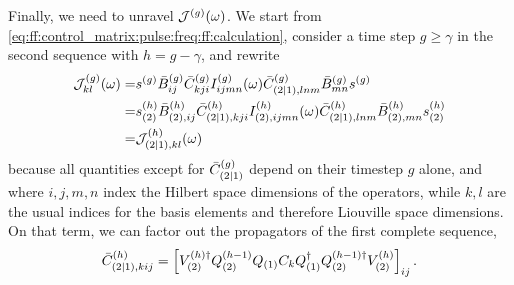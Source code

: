 Finally, we need to unravel $\mathcal{J}^{(g)}(\omega)$.
We start from \cref{eq:ff:control_matrix:pulse:freq:ff:calculation}, consider a time step $g\geq\gamma$ in the second sequence with $h = g-\gamma$, and rewrite
\begin{align}
        \mathcal{J}_{kl}^{(g)}(\omega) =& s^{(g)} \bar{B}_{ij}^{(g)} \bar{C}_{kji}^{(g)} I_{ijmn}^{(g)}(\omega)
                                       \bar{C}_{(2|1),lnm}^{(g)} \bar{B}_{mn}^{(g)} s^{(g)} \notag \\
                                   =& s_{(2)}^{(h)} \bar{B}_{(2),ij}^{(h)} \bar{C}_{(2|1),kji}^{(h)} I_{(2),ijmn}^{(h)}(\omega)
                                       \bar{C}_{(2|1),lnm}^{(h)} \bar{B}_{(2),mn}^{(h)} s_{(2)}^{(h)} \notag \\
                                   =& \mathcal{J}_{(2|1),kl}^{(h)}(\omega) \label{eq:app:ff:filter_function:incomplete_timestep}
\end{align}
because all quantities except for $\bar{C}_{(2|1)}^{(g)}$ depend on their timestep $g$ alone, and where $i,j,m,n$ index the Hilbert space dimensions of the operators, while $k,l$ are the usual indices for the basis elements and therefore Liouville space dimensions.
On that term, we can factor out the propagators of the first complete sequence,
\begin{align}
    \bar{C}_{(2|1),kij}^{(h)} = \left[V_{(2)}^{(h)\dagger}Q_{(2)}^{(h-1)} Q_{(1)} C_k Q_{(1)}^\dagger Q_{(2)}^{(h-1)\dagger}V_{(2)}^{(h)}\right]_{ij}.
\end{align}

